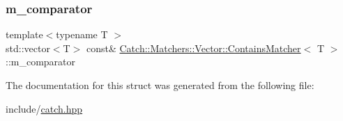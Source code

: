 \subsubsection{\texorpdfstring{m\+\_\+comparator}{m\_comparator}}
{\footnotesize\ttfamily template$<$typename T $>$ \\
std\+::vector$<$T$>$ const\& \mbox{\hyperlink{structCatch_1_1Matchers_1_1Vector_1_1ContainsMatcher}{Catch\+::\+Matchers\+::\+Vector\+::\+Contains\+Matcher}}$<$ T $>$\+::m\+\_\+comparator}



The documentation for this struct was generated from the following file\+:\begin{DoxyCompactItemize}
\item 
include/\mbox{\hyperlink{catch_8hpp}{catch.\+hpp}}\end{DoxyCompactItemize}

